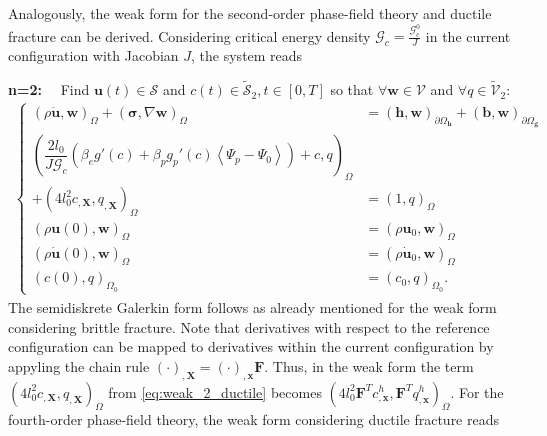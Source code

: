 Analogously, the weak form for the second-order phase-field theory and ductile fracture can be derived. Considering critical energy density $\mathcal{G}_{c}=\frac{\mathcal{G}_{c}^{0}}{J}$ in the current configuration with Jacobian $J$, the system reads

\textbf{n=2:}$\quad$ Find $\mathbf{u}\left(t\right)\in\bm{\mathcal{S}}$ and $c\left(t\right)\in\tilde{\mathcal{S}}_{2},t\in\left[0,T\right]$ so that $\forall \mathbf{w}\in\bm{\mathcal{V}}$ and $\forall q\in\tilde{\mathcal{V}}_{2}$:
\begin{equation} \label{eq:weak_2_ductile}
\begin{aligned}
\left\{\begin{alignedat}{1}
	\left(\rho \ddot{\mathbf{u}},\mathbf{w}\right)_{\Omega} + \left(\bm{\sigma},\nabla\mathbf{w}\right)_{\Omega} &= \left(\mathbf{h},\mathbf{w}\right)_{\partial\Omega_{\mathbf{h}}} + \left(\mathbf{b},\mathbf{w}\right)_{\partial\Omega_{\mathbf{g}}} \\
	\left(\dfrac{2l_{0}}{J\mathcal{G}_{c}}\left(\beta_{e}g'\left(c\right)+\beta_{p}g_{p}'\left(c\right)\left<\Psi_{p}-\Psi_{0}\right>\right)+c,q\right)_{\Omega} & \\
	+\left(4l_{0}^{2} c_{,\mathbf{X}}, q_{,\mathbf{X}}\right)_{\Omega} &= \left(1,q\right)_{\Omega} \\
	\left(\rho\mathbf{u}\left(0\right),\mathbf{w}\right)_{\Omega} &= \left(\rho\mathbf{u}_{0},\mathbf{w}\right)_{\Omega} \\
	\left(\rho\dot{\mathbf{u}}\left(0\right),\mathbf{w}\right)_{\Omega} &= \left(\rho\dot{\mathbf{u}}_{0},\mathbf{w}\right)_{\Omega} \\
	\left(c\left(0\right),q\right)_{\Omega_{0}} &= \left(c_{0},q\right)_{\Omega_{0}}.
\end{alignedat}\right.
\end{aligned}
\end{equation}
The semidiskrete Galerkin form follows as already mentioned for the weak form considering brittle fracture. Note that derivatives with respect to the reference configuration can be mapped to derivatives within the current configuration by appyling the chain rule $\left(\cdot\right)_{,\mathbf{X}}=\left(\cdot\right)_{,\mathbf{x}}\mathbf{F}$. Thus, in the weak form the term $\left(4l_{0}^{2} c_{,\mathbf{X}}, q_{,\mathbf{X}}\right)_{\Omega}$ from \eqref{eq:weak_2_ductile} becomes $\left(4l_{0}^{2} \mathbf{F}^{T}c_{,\mathbf{x}}^{h}, \mathbf{F}^{T}q_{,\mathbf{x}}^{h}\right)_{\Omega}$.
For the fourth-order phase-field theory, the weak form considering ductile fracture reads

